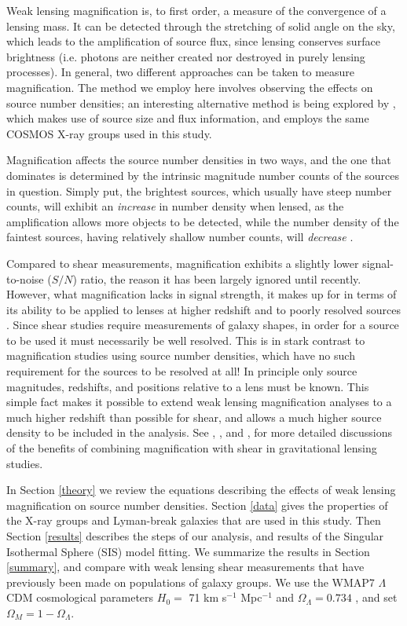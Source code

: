 Weak lensing magnification is, to first order, a measure of the convergence of a lensing mass.  It can be detected through the stretching of solid angle on the sky, which leads to the amplification of source flux, since lensing conserves surface brightness (i.e. photons are neither created nor destroyed in purely lensing processes). In general, two different approaches can be taken to measure magnification.  The method we employ here involves observing the effects on source number densities; an interesting alternative method is being explored by \citet{Schmidt12}, which makes use of source size and flux information, and employs the same COSMOS X-ray groups used in this study.

Magnification affects the source number densities in two ways, and the one that dominates is determined by the intrinsic magnitude number counts of the sources in question.  Simply put, the brightest sources, which usually have steep number counts, will exhibit an {\it increase} in number density when lensed, as the amplification allows more objects to be detected, while the number density of the faintest sources, having relatively shallow number counts, will {\it decrease} \citep{Narayan89}.

Compared to shear measurements, magnification exhibits a slightly lower signal-to-noise ($S/N$) ratio, the reason it has been largely ignored until recently.  However, what magnification lacks in signal strength, it makes up for in terms of its ability to be applied to lenses at higher redshift and to poorly resolved sources \citep{Waerbeke10}.  Since shear studies require measurements of galaxy shapes, in order for a source to be used it must necessarily be well resolved.  This is in stark contrast to magnification studies using source number densities, which have no such requirement for the sources to be resolved at all!  In principle only source magnitudes, redshifts, and positions relative to a lens must be known.  This simple fact makes it possible to extend weak lensing magnification analyses to a much higher redshift than possible for shear, and allows a much higher source density to be included in the analysis.  See \citet{Waerbeke10}, \citet{RozoSchmidt10}, and \citet{Umetsu11}, for more detailed discussions of the benefits of combining magnification with shear in gravitational lensing studies. 

In Section \ref{theory} we review the equations describing the effects of weak lensing magnification on source number densities.  Section \ref{data} gives the properties of the X-ray groups and Lyman-break galaxies that are used in this study.  Then Section \ref{results} describes the steps of our analysis, and results of the Singular Isothermal Sphere (SIS) model fitting.  We summarize the results in Section \ref{summary}, and compare with weak lensing shear measurements that have previously been made on populations of galaxy groups.  We use the WMAP7 $\Lambda$CDM cosmological parameters $H_0 =$ 71 km s$^{-1}$ Mpc$^{-1}$ and $\Omega_{\Lambda} = 0.734$ \citep{WMAP7}, and set $\Omega_M = 1 - \Omega_{\Lambda}$.

